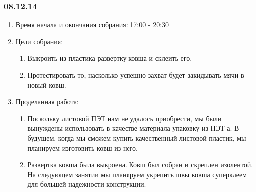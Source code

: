 \subsubsection{08.12.14}

\begin{enumerate}
	\item Время начала и окончания собрания:
	17:00 - 20:30
	\item Цели собрания:
	\begin{enumerate}
	  \item Выкроить из пластика развертку ковша и склеить его.
	  
	  \item Протестировать то, насколько успешно захват будет закидывать мячи в новый ковш.
	  
    \end{enumerate}
	\item Проделанная работа:
	\begin{enumerate}
	  \item Поскольку листовой ПЭТ нам не удалось приобрести, мы были вынуждены использовать в качестве материала упаковку из ПЭТ-а. В будущем, когда мы сможем купить качественный листовой пластик, мы планируем изготовить ковш из него.
	  
	  \item Развертка ковша была выкроена. Ковш был собран и скреплен изолентой. На следующем занятии мы планируем укрепить швы ковша суперклеем для большей надежности конструкции.
	  

\end{enumerate}
\end{enumerate}
